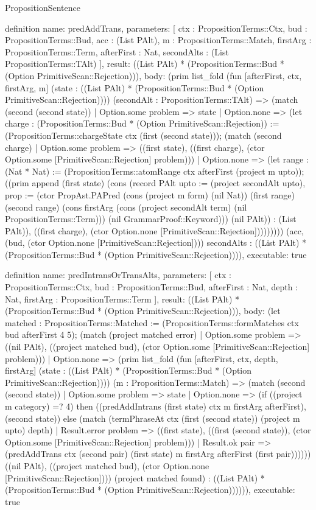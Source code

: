 \begin{lexlean}{PropositionSentence}
\begin{semanticmodule}
definition{
  name: predAddTrans,
  parameters: [
    ctx : PropositionTerms::Ctx,
    bud : PropositionTerms::Bud,
    acc : (List PAlt),
    m : PropositionTerms::Match,
    firstArg : PropositionTerms::Term,
    afterFirst : Nat,
    secondAlts : (List PropositionTerms::TAlt)
  ],
  result: ((List PAlt) * (PropositionTerms::Bud * (Option PrimitiveScan::Rejection))),
  body: (prim list_fold (fun [afterFirst, ctx, firstArg, m] (state : ((List PAlt) * (PropositionTerms::Bud * (Option PrimitiveScan::Rejection)))) (secondAlt : PropositionTerms::TAlt) => (match (second (second state))
    | Option.some problem => state
    | Option.none => (let charge : (PropositionTerms::Bud * (Option PrimitiveScan::Rejection)) := (PropositionTerms::chargeState ctx (first (second state))); (match (second charge)
        | Option.some problem => ((first state), ((first charge), (ctor Option.some [PrimitiveScan::Rejection] problem)))
        | Option.none => (let range : (Nat * Nat) := (PropositionTerms::atomRange ctx afterFirst (project m upto)); ((prim append (first state) (cons (record PAlt {upto := (project secondAlt upto), prop := (ctor PropAst.PAPred (cons (project m form) (nil Nat)) (first range) (second range) (cons firstArg (cons (project secondAlt term) (nil PropositionTerms::Term))) (nil GrammarProof::Keyword))}) (nil PAlt)) : (List PAlt)), ((first charge), (ctor Option.none [PrimitiveScan::Rejection])))))))) (acc, (bud, (ctor Option.none [PrimitiveScan::Rejection]))) secondAlts : ((List PAlt) * (PropositionTerms::Bud * (Option PrimitiveScan::Rejection)))),
  executable: true
}

definition{
  name: predIntransOrTransAlts,
  parameters: [
    ctx : PropositionTerms::Ctx,
    bud : PropositionTerms::Bud,
    afterFirst : Nat,
    depth : Nat,
    firstArg : PropositionTerms::Term
  ],
  result: ((List PAlt) * (PropositionTerms::Bud * (Option PrimitiveScan::Rejection))),
  body: (let matched : PropositionTerms::Matched := (PropositionTerms::formMatches ctx bud afterFirst 4 5); (match (project matched error)
    | Option.some problem => ((nil PAlt), ((project matched bud), (ctor Option.some [PrimitiveScan::Rejection] problem)))
    | Option.none => (prim list_fold (fun [afterFirst, ctx, depth, firstArg] (state : ((List PAlt) * (PropositionTerms::Bud * (Option PrimitiveScan::Rejection)))) (m : PropositionTerms::Match) => (match (second (second state))
      | Option.some problem => state
      | Option.none => (if ((project m category) =? 4) then ((predAddIntrans (first state) ctx m firstArg afterFirst), (second state)) else (match (termPhraseAt ctx (first (second state)) (project m upto) depth)
        | Result.error problem => ((first state), ((first (second state)), (ctor Option.some [PrimitiveScan::Rejection] problem)))
        | Result.ok pair => (predAddTrans ctx (second pair) (first state) m firstArg afterFirst (first pair)))))) ((nil PAlt), ((project matched bud), (ctor Option.none [PrimitiveScan::Rejection]))) (project matched found) : ((List PAlt) * (PropositionTerms::Bud * (Option PrimitiveScan::Rejection)))))),
  executable: true
}


\end{semanticmodule}
\end{lexlean}
